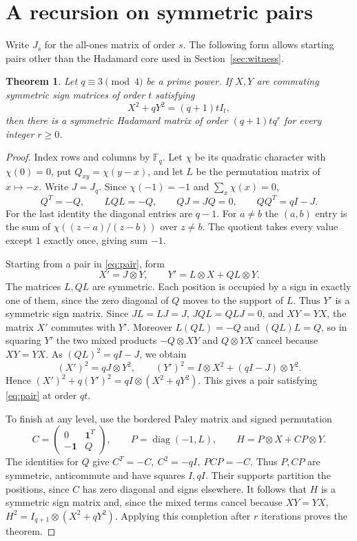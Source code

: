 \documentclass[11pt,letterpaper]{article}
\newtheorem{theorem}{Theorem}
\newcommand{\F}{\mathbb F}
\newcommand{\one}{\mathbf 1}
\begin{document}
\newpage
\section{A recursion on symmetric pairs}
Write \(J_s\) for the all-ones matrix of order \(s\). The following form allows starting pairs other than the Hadamard core used in Section~\ref{sec:witness}.

\begin{theorem}\label{thm:transfer}
Let \(q\equiv3\pmod4\) be a prime power. If \(X,Y\) are commuting symmetric sign matrices of order \(t\) satisfying
\begin{equation}
 X^2+qY^2=(q+1)tI_t, \label{eq:pair}
\end{equation}
then there is a symmetric Hadamard matrix of order \((q+1)tq^r\) for every integer \(r\geq0\).
\end{theorem}

\begin{proof}
Index rows and columns by \(\F_q\). Let \(\chi\) be its quadratic character with \(\chi(0)=0\), put \(Q_{xy}=\chi(y-x)\), and let \(L\) be the permutation matrix of \(x\mapsto-x\). Write \(J=J_q\). Since \(\chi(-1)=-1\) and \(\sum_x\chi(x)=0\),
\[
 Q^T=-Q,\qquad LQL=-Q,\qquad QJ=JQ=0,\qquad QQ^T=qI-J.
\]
For the last identity the diagonal entries are \(q-1\). For \(a\ne b\) the \((a,b)\) entry is the sum of \(\chi((z-a)/(z-b))\) over \(z\ne b\). The quotient takes every value except \(1\) exactly once, giving sum \(-1\).

Starting from a pair in \eqref{eq:pair}, form
\begin{equation}
 X'=J\otimes Y,\qquad Y'=L\otimes X+QL\otimes Y. \label{eq:lift}
\end{equation}
The matrices \(L,QL\) are symmetric. Each position is occupied by a sign in exactly one of them, since the zero diagonal of \(Q\) moves to the support of \(L\). Thus \(Y'\) is a symmetric sign matrix. Since \(JL=LJ=J\), \(JQL=QLJ=0\), and \(XY=YX\), the matrix \(X'\) commutes with \(Y'\). Moreover \(L(QL)=-Q\) and \((QL)L=Q\), so in squaring \(Y'\) the two mixed products \(-Q\otimes XY\) and \(Q\otimes YX\) cancel because \(XY=YX\). As \((QL)^2=qI-J\), we obtain
\[
 (X')^2=qJ\otimes Y^2,\qquad
 (Y')^2=I\otimes X^2+(qI-J)\otimes Y^2 .
\]
Hence \((X')^2+q(Y')^2=qI\otimes(X^2+qY^2)\). This gives a pair satisfying \eqref{eq:pair} at order \(qt\).

To finish at any level, use the bordered Paley matrix and signed permutation
\[
 C=\begin{pmatrix}0&\one^T\\-\one&Q\end{pmatrix},\qquad
 P=\operatorname{diag}(-1,L),\qquad H=P\otimes X+CP\otimes Y .
\]
The identities for \(Q\) give \(C^T=-C,\ C^2=-qI,\ PCP=-C\). Thus \(P,CP\) are symmetric, anticommute and have squares \(I,qI\). Their supports partition the positions, since \(C\) has zero diagonal and signs elsewhere. It follows that \(H\) is a symmetric sign matrix and, since the mixed terms cancel because \(XY=YX\), \(H^2=I_{q+1}\otimes(X^2+qY^2)\). Applying this completion after \(r\) iterations proves the theorem.
\end{proof}
\end{document}
